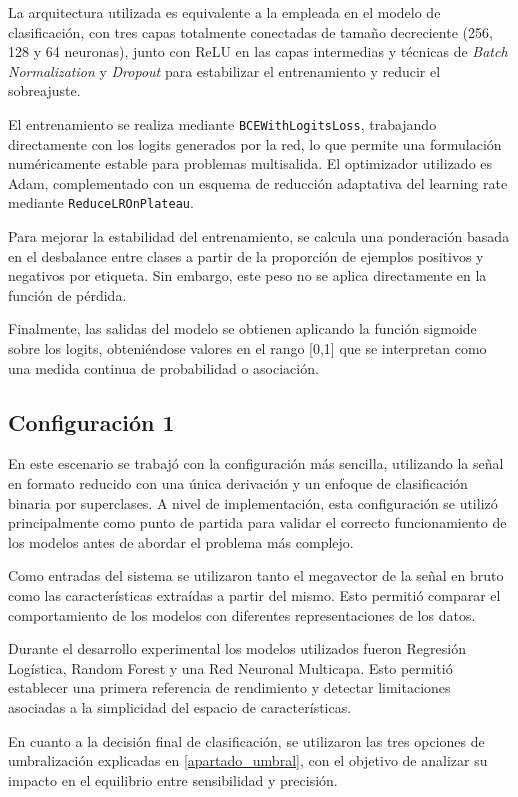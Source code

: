\documentclass[12pt,a4paper,twoside]{book}
\begin{document}
La arquitectura utilizada es equivalente a la empleada en el modelo de clasificación, con tres capas totalmente conectadas de tamaño decreciente (256, 128 y 64 neuronas), junto con ReLU en las capas intermedias y técnicas de \textit{Batch Normalization} y \textit{Dropout} para estabilizar el entrenamiento y reducir el sobreajuste.

El entrenamiento se realiza mediante \texttt{BCEWithLogitsLoss}, trabajando directamente con los logits generados por la red, lo que permite una formulación numéricamente estable para problemas multisalida. 
El optimizador utilizado es Adam, complementado con un esquema de reducción adaptativa del learning rate mediante \texttt{ReduceLROnPlateau}.

Para mejorar la estabilidad del entrenamiento, se calcula una ponderación basada en el desbalance entre clases a partir de la proporción de ejemplos positivos y negativos por etiqueta. 
Sin embargo, este peso no se aplica directamente en la función de pérdida.

Finalmente, las salidas del modelo se obtienen aplicando la función sigmoide sobre los logits, obteniéndose valores en el rango [0,1] que se interpretan como una medida continua de probabilidad o asociación.

\subsection{Configuración 1}

En este escenario se trabajó con la configuración más sencilla, utilizando la señal en formato reducido con una única derivación y un enfoque de clasificación binaria por superclases.
A nivel de implementación, esta configuración se utilizó principalmente como punto de partida para validar el correcto funcionamiento de los modelos antes de abordar el problema más complejo.

Como entradas del sistema se utilizaron tanto el megavector de la señal en bruto como las características extraídas a partir del mismo.
Esto permitió comparar el comportamiento de los modelos con diferentes representaciones de los datos.

Durante el desarrollo experimental los modelos utilizados fueron Regresión Logística, Random Forest y una Red Neuronal Multicapa.
Esto permitió establecer una primera referencia de rendimiento y detectar limitaciones asociadas a la simplicidad del espacio de características.

En cuanto a la decisión final de clasificación, se utilizaron las tres opciones de umbralización explicadas en \ref{apartado_umbral}, con el objetivo de analizar su impacto en el equilibrio entre sensibilidad y precisión.
\end{document}
